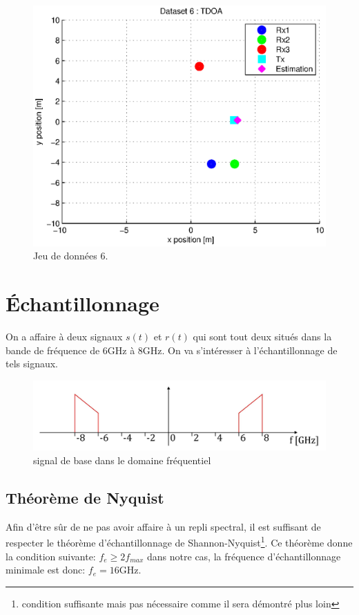 \documentclass[10pt,a4paper]{article}
\begin{document}
\begin{figure}[h]
\centering
\includegraphics[scale = 0.5]{TDOA6}
\caption{Jeu de données 6.}
\label{ex3}
\end{figure}


\section{Échantillonnage}
On a affaire à deux signaux $s(t)$ et $r(t)$ qui sont tout deux situés dans la bande de fréquence de 6GHz à 8GHz. On va s'intéresser à l'échantillonnage de tels signaux.
\begin{figure}[h!]
\centering
\includegraphics[scale=0.5]{sig.jpg}
\caption{signal de base dans le domaine fréquentiel}
\label{sig}
\end{figure}
\subsection{Théorème de Nyquist}
Afin d'être sûr de ne pas avoir affaire à un repli spectral, il est suffisant de respecter le théorème d'échantillonnage de Shannon-Nyquist\footnote{condition suffisante mais pas nécessaire comme il sera démontré plus loin}. Ce théorème donne la condition suivante: $f_e\geqslant 2f_{max}$ dans notre cas, la fréquence d'échantillonnage minimale est donc: $f_e=16\text{GHz}$.
\end{document}
